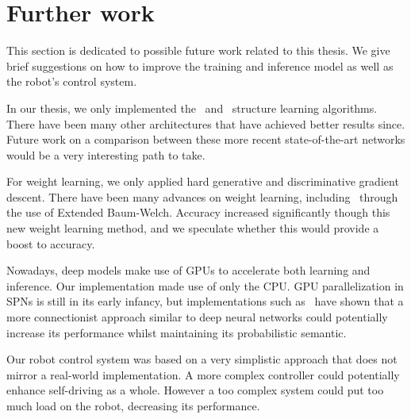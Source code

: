 \section{Further work}

This section is dedicated to possible future work related to this thesis. We give brief suggestions
on how to improve the training and inference model as well as the robot's control system.

In our thesis, we only implemented the~\cite{gens-domingos} and~\cite{clustering} structure
learning algorithms. There have been many other architectures that have achieved better results
since. Future work on a comparison between these more recent state-of-the-art networks would be a
very interesting path to take.

For weight learning, we only applied hard generative and discriminative gradient descent. There
have been many advances on weight learning, including~\cite{baum-welch} through the use of Extended
Baum-Welch. Accuracy increased significantly though this new weight learning method, and we
speculate whether this would provide a boost to accuracy.

Nowadays, deep models make use of GPUs to accelerate both learning and inference. Our
implementation made use of only the CPU. GPU parallelization in SPNs is still in its early infancy,
but implementations such as~\cite{deep-learn-spn} have shown that a more connectionist approach
similar to deep neural networks could potentially increase its performance whilst maintaining its
probabilistic semantic.

Our robot control system was based on a very simplistic approach that does not mirror a real-world
implementation. A more complex controller could potentially enhance self-driving as a whole.
However a too complex system could put too much load on the robot, decreasing its performance.

